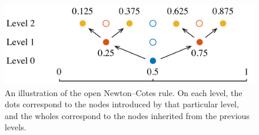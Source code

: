\begin{figure}[t]
  \centering
  \includegraphics[width=1.0\columnwidth]{include/assets/figures/rule.pdf}
  \caption{
    An illustration of the open Newton--Cotes rule. On each level, the dots
    correspond to the nodes introduced by that particular level, and the wholes
    correspond to the nodes inherited from the previous levels.
  }
\end{figure}
